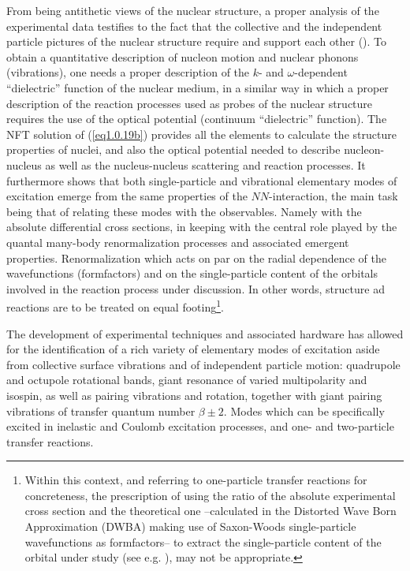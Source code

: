 \documentclass[a4paper,11pt]{book}
\numberwithin{equation}{section}
\numberwithin{figure}{section}
\numberwithin{table}{section}
\begin{document}
From being antithetic views of the nuclear structure, a proper analysis of the experimental data testifies to the fact that the collective and the independent particle pictures of the nuclear structure require and support each other (\cite{Bohr:75}). To obtain a quantitative description of nucleon  motion and nuclear phonons (vibrations), one needs a proper description of the $k$- and $\omega$-dependent ``dielectric'' function of the nuclear medium, in a similar way in which a proper description of the reaction processes used as probes of the nuclear structure requires the use of the optical potential (continuum ``dielectric'' function). The NFT solution of (\ref{eq1.0.19b}) provides all the elements to calculate the  structure properties of nuclei, and also  the optical potential needed to describe nucleon-nucleus as well as the nucleus-nucleus scattering and reaction processes. It furthermore shows that both single-particle and vibrational elementary modes of excitation emerge from the same properties of the $NN$-interaction,  the main task being  that of relating these modes with the observables. Namely  with the absolute differential cross sections, in keeping with the central role played by the quantal many-body renormalization processes and associated emergent properties. Renormalization which acts on par on the radial dependence of the wavefunctions (formfactors) and on the single-particle content of the orbitals involved in the reaction process under discussion. In other words, structure ad reactions are to be treated on equal footing\footnote{Within this context, and referring to one-particle transfer reactions for concreteness, the prescription of using the ratio of the absolute experimental cross section and the theoretical one --calculated in the Distorted Wave Born Approximation (DWBA) making use of Saxon-Woods single-particle wavefunctions as formfactors-- to extract the single-particle content of the orbital under study (see e.g. \cite{Schiffer:12}), may not be appropriate.}. 


The development of experimental techniques and associated hardware has allowed for the identification of a rich variety of elementary modes of excitation aside from collective surface vibrations and of independent particle motion: quadrupole and octupole rotational bands, giant resonance of varied multipolarity and isospin, as well as pairing vibrations and rotation, together with giant pairing vibrations of transfer quantum number $\beta\pm 2$. Modes which can be specifically excited in inelastic and Coulomb excitation processes, and one- and two-particle transfer reactions.
\end{document}
